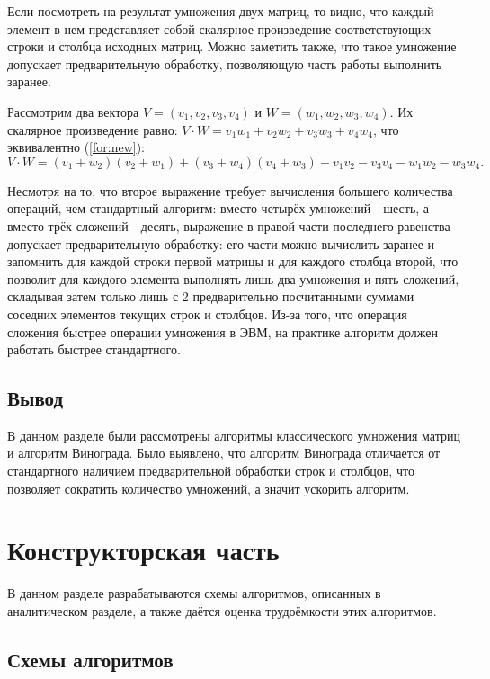 \documentclass[12pt]{report}
\begin{document}
Если посмотреть на результат умножения двух матриц, то видно, что каждый элемент в нем представляет собой скалярное произведение соответствующих строки и столбца исходных матриц.
Можно заметить также, что такое умножение допускает предварительную обработку, позволяющую часть работы выполнить заранее.

Рассмотрим два вектора $V = (v_1, v_2, v_3, v_4)$ и $W = (w_1, w_2, w_3, w_4)$.
Их скалярное произведение равно: $V \cdot W = v_1w_1 + v_2w_2 + v_3w_3 + v_4w_4$, что эквивалентно (\ref{for:new}):
\begin{equation}
	\label{for:new}
		V \cdot W = (v_1 + w_2)(v_2 + w_1) + (v_3 + w_4)(v_4 + w_3) - v_1v_2 - v_3v_4 - w_1w_2 - w_3w_4.
\end{equation}

Несмотря на то, что второе выражение требует вычисления большего количества операций, чем стандартный алгоритм: вместо четырёх умножений - шесть, а вместо трёх сложений - десять, выражение в правой части последнего равенства допускает предварительную обработку: его части можно вычислить заранее и запомнить для каждой строки первой матрицы и для каждого столбца второй, что позволит для каждого элемента выполнять лишь два умножения и пять сложений, складывая затем только лишь с 2 предварительно посчитанными суммами соседних элементов текущих строк и столбцов.
Из-за того, что операция сложения быстрее операции умножения в ЭВМ, на практике алгоритм должен работать быстрее стандартного.


\section{Вывод}
	В данном разделе были рассмотрены алгоритмы классического умножения матриц и алгоритм Винограда. Было выявлено, что алгоритм Винограда отличается от стандартного наличием предварительной обработки строк и столбцов, что позволяет сократить количество умножений, а значит ускорить алгоритм. 
\clearpage

\chapter{Конструкторская часть}

В данном разделе разрабатываются схемы алгоритмов, описанных в аналитическом разделе, а также даётся оценка трудоёмкости этих алгоритмов.
\section{Схемы алгоритмов}
\end{document}
